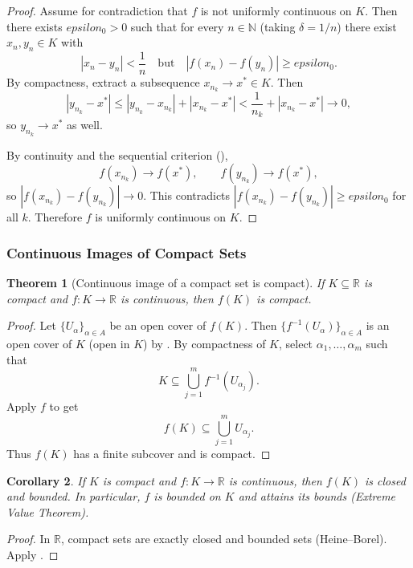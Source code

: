 \documentclass[12pt]{article}
\numberwithin{equation}{section}
\def\abs#1{|#1|}
\def\eps{epsilon}
\newcommand{\RR}{\mathbb{R}}
\newcommand{\NN}{\mathbb{N}}
\DeclarePairedDelimiter{\abs}{\lvert}{\rvert}
\newcommand{\eps}{\varepsilon}               %
\theoremstyle{plain}
\newtheorem{theorem}{Theorem}[section]
\newtheorem{corollary}[theorem]{Corollary}
\theoremstyle{definition}
\theoremstyle{remark}
\begin{document}
\begin{proof}
Assume for contradiction that $f$ is not uniformly continuous on $K$.
Then there exists $\eps_0>0$ such that for every $n\in\NN$ (taking $\delta=1/n$) there exist $x_n,y_n\in K$ with
\[
\abs{x_n-y_n}<\frac{1}{n}
\quad\text{but}\quad
\abs{f(x_n)-f(y_n)}\ge \eps_0.
\]
By compactness, extract a subsequence $x_{n_k}\to x^\ast\in K$.
Then
\[
\abs{y_{n_k}-x^\ast}
\le \abs{y_{n_k}-x_{n_k}}+\abs{x_{n_k}-x^\ast}
< \frac{1}{n_k}+\abs{x_{n_k}-x^\ast}\to 0,
\]
so $y_{n_k}\to x^\ast$ as well.

By continuity and the sequential criterion (),
\[
f(x_{n_k})\to f(x^\ast),\qquad f(y_{n_k})\to f(x^\ast),
\]
so $\abs{f(x_{n_k})-f(y_{n_k})}\to 0$.
This contradicts $\abs{f(x_{n_k})-f(y_{n_k})}\ge \eps_0$ for all $k$.
Therefore $f$ is uniformly continuous on $K$.
\end{proof}

\subsubsection{Continuous Images of Compact Sets}

\begin{theorem}[Continuous image of a compact set is compact]\label{thm:cont-image-compact}
If $K\subseteq\RR$ is compact and $f:K\to\RR$ is continuous, then $f(K)$ is compact.
\end{theorem}

\begin{proof}
Let $\{U_\alpha\}_{\alpha\in A}$ be an open cover of $f(K)$.
Then $\{f^{-1}(U_\alpha)\}_{\alpha\in A}$ is an open cover of $K$ (open in $K$) by .
By compactness of $K$, select $\alpha_1,\dots,\alpha_m$ such that
\[
K \subseteq \bigcup_{j=1}^{m} f^{-1}(U_{\alpha_j}).
\]
Apply $f$ to get
\[
f(K) \subseteq \bigcup_{j=1}^{m} U_{\alpha_j}.
\]
Thus $f(K)$ has a finite subcover and is compact.
\end{proof}

\begin{corollary}\label{cor:compact-bdd-closed-image}
If $K$ is compact and $f:K\to\RR$ is continuous, then $f(K)$ is closed and bounded.
In particular, $f$ is bounded on $K$ and attains its bounds (Extreme Value Theorem).
\end{corollary}

\begin{proof}
In $\RR$, compact sets are exactly closed and bounded sets (Heine--Borel).
Apply .
\end{proof}
\end{document}
